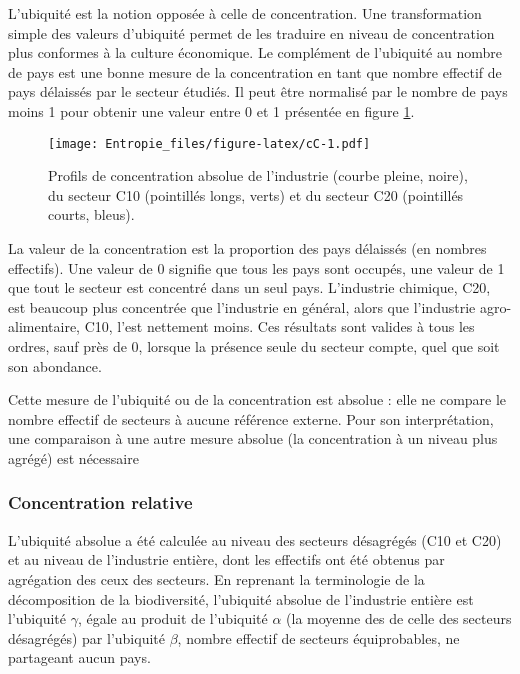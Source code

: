 \documentclass[fleqn,10pt]{ArtEcoFoG} %
\begin{document}
L'ubiquité est la notion opposée à celle de concentration. Une
transformation simple des valeurs d'ubiquité permet de les traduire en
niveau de concentration plus conformes à la culture économique. Le
complément de l'ubiquité au nombre de pays est une bonne mesure de la
concentration en tant que nombre effectif de pays délaissés par le
secteur étudiés. Il peut être normalisé par le nombre de pays moins 1
pour obtenir une valeur entre 0 et 1 présentée en figure \ref{fig:cC}.

\begin{figure}
\centering
\texttt{[image: Entropie\_files/figure-latex/cC-1.pdf]}
\caption{\label{fig:cC}Profils de concentration absolue de l'industrie
(courbe pleine, noire), du secteur C10 (pointillés longs, verts) et du
secteur C20 (pointillés courts, bleus).}
\end{figure}

La valeur de la concentration est la proportion des pays délaissés (en
nombres effectifs). Une valeur de 0 signifie que tous les pays sont
occupés, une valeur de 1 que tout le secteur est concentré dans un seul
pays. L'industrie chimique, C20, est beaucoup plus concentrée que
l'industrie en général, alors que l'industrie agro-alimentaire, C10,
l'est nettement moins. Ces résultats sont valides à tous les ordres,
sauf près de 0, lorsque la présence seule du secteur compte, quel que
soit son abondance.

Cette mesure de l'ubiquité ou de la concentration est absolue
\citep{Brulhart2005}: elle ne compare le nombre effectif de secteurs à
aucune référence externe. Pour son interprétation, une comparaison à une
autre mesure absolue (la concentration à un niveau plus agrégé) est
nécessaire \citep{Marcon2012c}

\subsubsection{Concentration relative}\label{concentration-relative}

L'ubiquité absolue a été calculée au niveau des secteurs désagrégés (C10
et C20) et au niveau de l'industrie entière, dont les effectifs ont été
obtenus par agrégation des ceux des secteurs. En reprenant la
terminologie de la décomposition de la biodiversité, l'ubiquité absolue
de l'industrie entière est l'ubiquité \(\gamma\), égale au produit de
l'ubiquité \(\alpha\) (la moyenne des de celle des secteurs désagrégés)
par l'ubiquité \(\beta\), nombre effectif de secteurs équiprobables, ne
partageant aucun pays.
\end{document}
